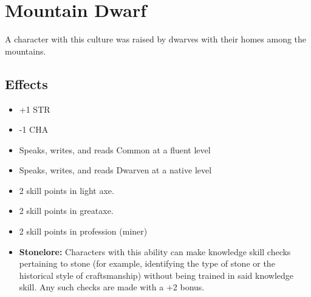 \section{Mountain Dwarf}\label{culture:mountain-dwarf}
A character with this culture was raised by dwarves with their homes among the
mountains.

\subsection{Effects}
\begin{itemize}
    \item +1 STR
    \item -1 CHA
    \item Speaks, writes, and reads Common at a fluent level
    \item Speaks, writes, and reads Dwarven at a native level
    \item 2 skill points in light axe.
    \item 2 skill points in greataxe.
    \item 2 skill points in profession (miner)
    \item \textbf{Stonelore:} Characters with this ability can make knowledge
        skill checks pertaining to stone (for example, identifying the type of
        stone or the historical style of craftsmanship) without being trained
        in said knowledge skill. Any such checks are made with a +2 bonus.
\end{itemize}
